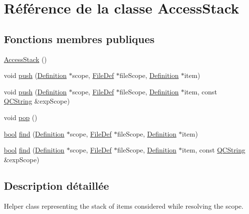 \hypertarget{class_access_stack}{}\section{Référence de la classe Access\+Stack}
\label{class_access_stack}
\subsection*{Fonctions membres publiques}
\begin{DoxyCompactItemize}
\item 
\hyperlink{class_access_stack_a7b39a1a6d9f477ec68863d87b6f41390}{Access\+Stack} ()
\item 
void \hyperlink{class_access_stack_a3b1805f54c909feaeeb8c4186a8e017b}{push} (\hyperlink{class_definition}{Definition} $\ast$scope, \hyperlink{class_file_def}{File\+Def} $\ast$file\+Scope, \hyperlink{class_definition}{Definition} $\ast$item)
\item 
void \hyperlink{class_access_stack_adea59c73a9c0d416fe4a98a9b4a0d504}{push} (\hyperlink{class_definition}{Definition} $\ast$scope, \hyperlink{class_file_def}{File\+Def} $\ast$file\+Scope, \hyperlink{class_definition}{Definition} $\ast$item, const \hyperlink{class_q_c_string}{Q\+C\+String} \&exp\+Scope)
\item 
void \hyperlink{class_access_stack_a3cd93006259acc5edf0cad527c3935bb}{pop} ()
\item 
\hyperlink{qglobal_8h_a1062901a7428fdd9c7f180f5e01ea056}{bool} \hyperlink{class_access_stack_ac01ea73d80a7e32c5eef29ab05f366ca}{find} (\hyperlink{class_definition}{Definition} $\ast$scope, \hyperlink{class_file_def}{File\+Def} $\ast$file\+Scope, \hyperlink{class_definition}{Definition} $\ast$item)
\item 
\hyperlink{qglobal_8h_a1062901a7428fdd9c7f180f5e01ea056}{bool} \hyperlink{class_access_stack_afbb61058e2b8a0bfa2286dfb5ee06766}{find} (\hyperlink{class_definition}{Definition} $\ast$scope, \hyperlink{class_file_def}{File\+Def} $\ast$file\+Scope, \hyperlink{class_definition}{Definition} $\ast$item, const \hyperlink{class_q_c_string}{Q\+C\+String} \&exp\+Scope)
\end{DoxyCompactItemize}


\subsection{Description détaillée}
Helper class representing the stack of items considered while resolving the scope. 


